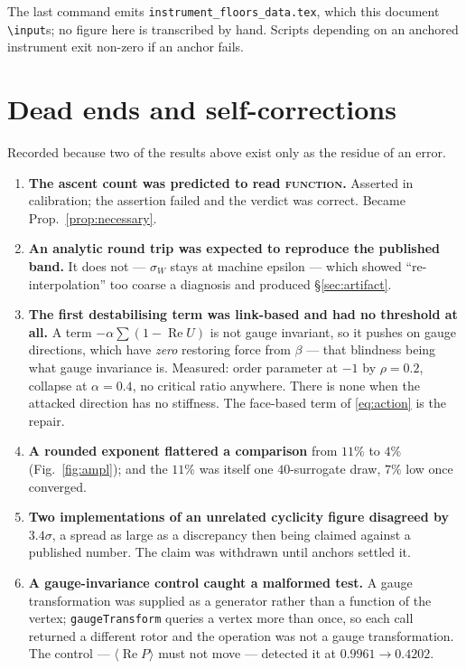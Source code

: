 \documentclass[11pt]{article}
\theoremstyle{remark}
\newcommand{\tier}[1]{\textsc{\MakeLowercase{#1}}}
\begin{document}
The last command emits \texttt{instrument\_floors\_data.tex}, which this document
\texttt{\textbackslash input}s; no figure here is transcribed by hand. Scripts depending
on an anchored instrument exit non-zero if an anchor fails.

\appendix
\section{Dead ends and self-corrections}

Recorded because two of the results above exist only as the residue of an error.

\begin{enumerate}[leftmargin=2em,itemsep=4pt]
\item \textbf{The ascent count was predicted to read \tier{FUNCTION}.} Asserted in
calibration; the assertion failed and the verdict was correct. Became
Prop.~\ref{prop:necessary}.

\item \textbf{An analytic round trip was expected to reproduce the published band.} It
does not --- $\sigma_W$ stays at machine epsilon --- which showed
``re-interpolation'' too coarse a diagnosis and produced \S\ref{sec:artifact}.

\item \textbf{The first destabilising term was link-based and had no threshold at all.}
A term $-\alpha\sum(1-\operatorname{Re}U)$ is not gauge invariant, so it pushes on gauge
directions, which have \emph{zero} restoring force from $\beta$ --- that blindness being
what gauge invariance is. Measured: order parameter at $-1$ by $\rho=0.2$, collapse at
$\alpha=0.4$, no critical ratio anywhere. There is none when the attacked direction has
no stiffness. The face-based term of \eqref{eq:action} is the repair.

\item \textbf{A rounded exponent flattered a comparison} from $11\%$ to $4\%$
(Fig.~\ref{fig:ampl}); and the $11\%$ was itself one $40$-surrogate draw, $7\%$ low once
converged.

\item \textbf{Two implementations of an unrelated cyclicity figure disagreed by
$3.4\sigma$}, a spread as large as a discrepancy then being claimed against a published
number. The claim was withdrawn until anchors settled it.

\item \textbf{A gauge-invariance control caught a malformed test.} A gauge
transformation was supplied as a generator rather than a function of the vertex;
\texttt{gaugeTransform} queries a vertex more than once, so each call returned a
different rotor and the operation was not a gauge transformation. The control ---
$\langle\operatorname{Re}P\rangle$ must not move --- detected it at $0.9961\to0.4202$.
\end{enumerate}
\end{document}
